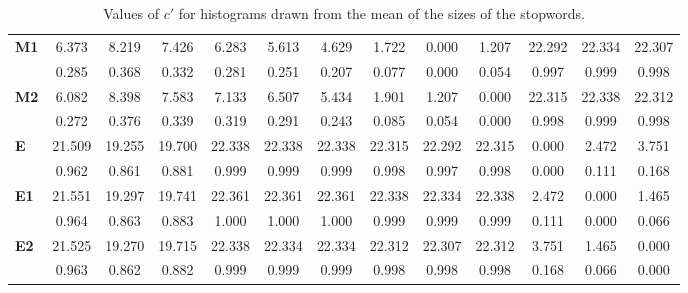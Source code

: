 \begin{table*}[h!]
\begin{center}
\begin{tabular}{| l || c | c | c || c | c | c || c | c | c || c | c | c |}
{\bf M1} & 6.373 & 8.219 & 7.426 & 6.283 & 5.613 & 4.629 & 1.722 & 0.000 & 1.207 & 22.292 & 22.334 & 22.307 \\
 & 0.285  & 0.368  & 0.332  & 0.281  & 0.251  & 0.207  & 0.077  & 0.000  & 0.054  & 0.997  & 0.999  & 0.998 \\\hline
{\bf M2} & 6.082 & 8.398 & 7.583 & 7.133 & 6.507 & 5.434 & 1.901 & 1.207 & 0.000 & 22.315 & 22.338 & 22.312 \\
 & 0.272  & 0.376  & 0.339  & 0.319  & 0.291  & 0.243  & 0.085  & 0.054  & 0.000  & 0.998  & 0.999  & 0.998 \\\hline\hline
{\bf E} & 21.509 & 19.255 & 19.700 & 22.338 & 22.338 & 22.338 & 22.315 & 22.292 & 22.315 & 0.000 & 2.472 & 3.751 \\
 & 0.962  & 0.861  & 0.881  & 0.999  & 0.999  & 0.999  & 0.998  & 0.997  & 0.998  & 0.000  & 0.111  & 0.168 \\\hline
{\bf E1} & 21.551 & 19.297 & 19.741 & 22.361 & 22.361 & 22.361 & 22.338 & 22.334 & 22.338 & 2.472 & 0.000 & 1.465 \\
 & 0.964  & 0.863  & 0.883  & 1.000  & 1.000  & 1.000  & 0.999  & 0.999  & 0.999  & 0.111  & 0.000  & 0.066 \\\hline
{\bf E2} & 21.525 & 19.270 & 19.715 & 22.338 & 22.334 & 22.334 & 22.312 & 22.307 & 22.312 & 3.751 & 1.465 & 0.000 \\
 & 0.963  & 0.862  & 0.882  & 0.999  & 0.999  & 0.999  & 0.998  & 0.998  & 0.998  & 0.168  & 0.066  & 0.000 \\\hline
\end{tabular}
\caption{Values of $c'$ for histograms drawn from the mean of the sizes of the stopwords.}
\end{center}
\end{table*}
